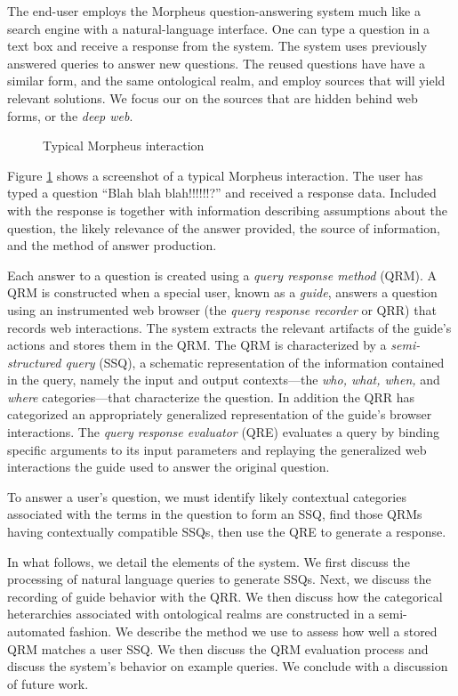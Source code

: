 
The end-user employs the Morpheus question-answering system much like a search engine with a natural-language interface. One can type a question in a text box and receive a response from the system. The system uses previously answered queries to answer new questions.  The reused questions have have a similar form, and the same ontological realm, and employ sources that will yield relevant solutions.  We focus our on the sources that are hidden behind web forms, or the \emph{deep web}.

\begin{figure}
\caption{Typical Morpheus interaction}
\label{fig:screenshot}
\end{figure}

Figure \ref{fig:screenshot} shows a screenshot of a typical Morpheus
interaction. The user has typed a question ``Blah blah blah!!!!!!?'' and
received a response data.  Included with the response is together with information describing assumptions
about the question, the likely relevance of the answer provided,
the source of information, and the method of answer production.

Each answer to a question is created using a \emph{query response
  method} (QRM). A QRM is constructed when a special user, known as a
\emph{guide}, answers a question using an instrumented web browser (the
\emph{query response recorder} or QRR) that records web
interactions. The system extracts the relevant artifacts of the
guide's actions and stores them in the QRM. The QRM is characterized
by a \emph{semi-structured query} (SSQ), a schematic representation of
the information contained in the query, namely the input and output
contexts---the \emph{who, what, when,} and \emph{where}
categories---that characterize the question.  In addition the QRR has categorized an
appropriately generalized representation of the guide's browser
interactions.  The \emph{query response evaluator} (QRE) evaluates a
query by binding specific arguments to its input parameters and
replaying the generalized web interactions the guide used to answer
the original question.

To answer a user's question, we must identify likely contextual
categories associated with the terms in the question to form an SSQ,
find those QRMs having contextually compatible SSQs, then use the QRE to
generate a response.


In what follows, we detail the elements of the system.  We first
discuss the processing of natural language queries to generate SSQs.
Next, we discuss the recording of guide behavior with the QRR.  We
then discuss how the categorical heterarchies associated with
ontological realms are constructed in a semi-automated fashion.  We
describe the method we use to assess how well a stored QRM matches a
user SSQ.  We then discuss the QRM evaluation process and discuss the
system's behavior on example queries. We conclude with a discussion of
future work.
 
